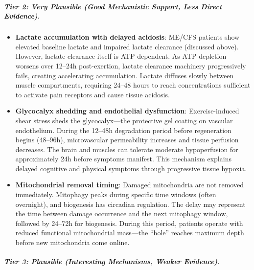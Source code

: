 \subparagraph{Tier 2: Very Plausible (Good Mechanistic Support, Less Direct Evidence).}

\begin{itemize}
    \item \textbf{Lactate accumulation with delayed acidosis}: ME/CFS patients show elevated baseline lactate and impaired lactate clearance (discussed above). However, lactate clearance itself is ATP-dependent. As ATP depletion worsens over 12--24h post-exertion, lactate clearance machinery progressively fails, creating accelerating accumulation. Lactate diffuses slowly between muscle compartments, requiring 24--48 hours to reach concentrations sufficient to activate pain receptors and cause tissue acidosis.

    \item \textbf{Glycocalyx shedding and endothelial dysfunction}: Exercise-induced shear stress sheds the glycocalyx---the protective gel coating on vascular endothelium. During the 12--48h degradation period before regeneration begins (48--96h), microvascular permeability increases and tissue perfusion decreases. The brain and muscles can tolerate moderate hypoperfusion for approximately 24h before symptoms manifest. This mechanism explains delayed cognitive and physical symptoms through progressive tissue hypoxia.

    \item \textbf{Mitochondrial removal timing}: Damaged mitochondria are not removed immediately. Mitophagy peaks during specific time windows (often overnight), and biogenesis has circadian regulation. The delay may represent the time between damage occurrence and the next mitophagy window, followed by 24--72h for biogenesis. During this period, patients operate with reduced functional mitochondrial mass---the ``hole'' reaches maximum depth before new mitochondria come online.
\end{itemize}

\subparagraph{Tier 3: Plausible (Interesting Mechanisms, Weaker Evidence).}

